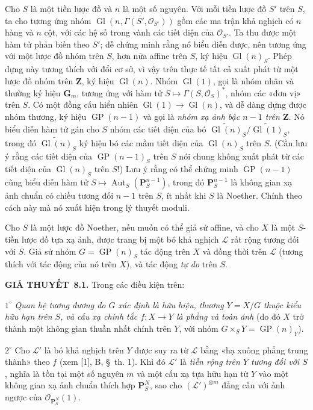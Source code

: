 \documentclass[11pt,twoside,openany]{book}
\numberwithin{equation}{section}
\newcommand{\src}[1]{%
  \phantomsection\hypertarget{src:\fgasourceid:#1}{}%
  \marginpar{\raggedleft\footnotesize\sffamily #1}%
}
\newcommand{\fgasourceid}{unset}
\newcommand{\result}[2]{\par\medskip\noindent\textbf{#1\if\relax\detokenize{#2}\relax\else\ #2\fi.}\quad}
\begin{document}
Cho $S$ là một tiền lược đồ và $n$ là một số nguyên. Với mỗi tiền lược đồ $S'$
trên $S$, ta cho tương ứng nhóm
$\operatorname{Gl}(n,\Gamma(S',\mathcal O_{S'}))$ gồm các ma trận khả nghịch có
$n$ hàng và $n$ cột, với các hệ số trong vành các tiết diện của
$\mathcal O_{S'}$. Ta thu được một hàm tử phản biến theo $S'$; dễ chứng minh
rằng nó biểu diễn được, nên tương ứng với một lược đồ nhóm trên $S$, hơn nữa
affine trên $S$, ký hiệu $\operatorname{Gl}(n)_S$. Phép dựng này tương thích
với đổi cơ sở, vì vậy trên thực tế tất cả xuất phát từ một lược đồ nhóm trên
$\mathbf Z$, ký hiệu $\operatorname{Gl}(n)$. Nhóm $\operatorname{Gl}(1)$, gọi
là nhóm nhân và thường ký hiệu $\mathbf G_m$, tương ứng với hàm tử
$S\longmapsto\Gamma(S,\mathcal O_S)^*$, nhóm các «đơn vị» trên $S$. Có một
đồng cấu hiển nhiên $\operatorname{Gl}(1)\to\operatorname{Gl}(n)$, và dễ dàng
dựng được nhóm thương, ký hiệu $\operatorname{GP}(n-1)$ và gọi là
\emph{nhóm xạ ảnh bậc $n-1$ trên $\mathbf Z$}. Nó biểu diễn hàm tử gán cho
$S$ nhóm các tiết diện của bó
$\widetilde{\operatorname{Gl}(n)}_S/
\widetilde{\operatorname{Gl}(1)}_S$, trong đó
$\widetilde{\operatorname{Gl}(n)}_S$ ký hiệu bó các mầm tiết diện của
$\operatorname{Gl}(n)_S$ trên $S$. (Cần lưu ý rằng các tiết diện của
$\operatorname{GP}(n-1)_S$ trên $S$ nói chung không xuất phát từ các tiết diện
của $\operatorname{Gl}(n)_S$ trên $S$!) Lưu ý rằng có thể chứng minh
$\operatorname{GP}(n-1)$ cũng biểu diễn hàm tử
$S\longmapsto\operatorname{Aut}_S(\mathbf P_S^{n-1})$, trong đó
$\mathbf P_S^{n-1}$ là không gian xạ ảnh chuẩn có chiều tương đối $n-1$ trên
$S$, ít nhất khi $S$ là Noether. Chính theo cách này mà nó xuất hiện trong lý
thuyết moduli.

Cho $S$ là một lược đồ Noether, nếu muốn có thể giả sử affine, và cho $X$ là
một $S$-tiền lược đồ tựa xạ ảnh, được trang bị một bó khả nghịch $\mathcal L$
rất rộng tương đối với $S$. Giả sử nhóm $G=\operatorname{GP}(n)_S$ tác động
trên $X$ và đồng thời trên $\mathcal L$ (tương thích với tác động của nó trên
$X$), và tác động \emph{tự do} trên $S$.
\src{117}

\result{GIẢ THUYẾT}{8.1} Trong các điều kiện trên:

\smallskip
\noindent $1^\circ$ \emph{Quan hệ tương đương do $G$ xác định là hữu hiệu,
thương $Y=X/G$ thuộc kiểu hữu hạn trên $S$, và cấu xạ chính tắc $f:X\to Y$ là
phẳng và toàn ánh} (do đó $X$ trở thành một không gian thuần nhất chính trên
$Y$, với nhóm $G\times_S Y=\operatorname{GP}(n)_Y$).

\smallskip
\noindent $2^\circ$ Cho $\mathcal L'$ là bó khả nghịch trên $Y$ được suy ra
từ $\mathcal L$ bằng «hạ xuống phẳng trung thành» theo $f$ (xem [1], B,
\S~th. 1). Khi đó $\mathcal L'$ là \emph{tiền rộng trên $Y$ tương đối với
$S$}, nghĩa là tồn tại một số nguyên $m$ và một cấu xạ tựa hữu hạn từ $Y$ vào
một không gian xạ ảnh chuẩn thích hợp $\mathbf P_S^N$, sao cho
$(\mathcal L')^{\otimes m}$ đẳng cấu với ảnh ngược của
$\mathcal O_{\mathbf P_S^N}(1)$.
\end{document}
